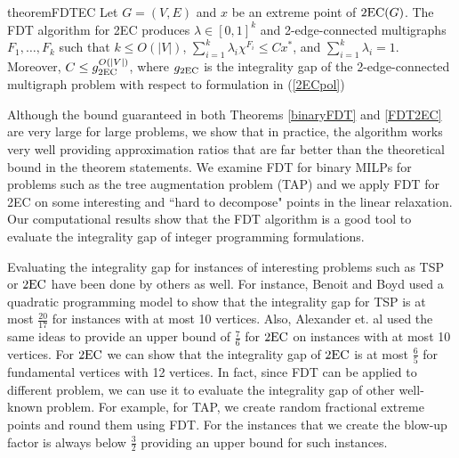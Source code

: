 \begin{restatable}{theorem}{FDTEC}
	\label{FDT2EC}
	Let $G=(V,E)$ and $x$ be an extreme point of  $\operatorname{2EC}(G)$. The FDT algorithm for 2EC produces $\lambda\in [0,1]^k$ and 2-edge-connected multigraphs $F_1,\ldots,F_k$ such that $k\leq O(|V|)$, $\sum_{i=1}^{k}\lambda_i \chi^{F_i}\leq Cx^*$, and $\sum_{i=1}^{k}\lambda_i = 1$. Moreover, $C\leq g_{\operatorname{2EC}}^{O(|V|)}$, where $g_{\operatorname{2EC}}$ is the integrality gap of the 2-edge-connected multigraph problem with respect to formulation in (\ref{2ECpol}) 
\end{restatable}


Although the bound guaranteed in both Theorems \ref{binaryFDT} and \ref{FDT2EC} are very large for large problems, we show that in practice, the algorithm works very well providing approximation ratios that are far better than the theoretical bound in the theorem statements. We examine FDT for binary MILPs for problems such as the tree augmentation problem (TAP) and we apply FDT for 2EC on some interesting and ``hard to decompose" points in the linear relaxation. Our computational results show that the FDT algorithm is a good tool to evaluate the integrality gap of integer programming formulations. 

Evaluating the integrality gap for instances of interesting problems such as TSP or $\operatorname{2EC}$ have been done by others as well. For instance, Benoit and Boyd \cite{TSPcompute} used a quadratic programming model to show that the integrality gap for TSP is at most $\frac{20}{17}$ for instances with at most 10 vertices. Also,  Alexander et. al \cite{abe} used the same ideas to provide an upper bound of $\frac{7}{6}$ for $\operatorname{2EC}$ on instances with at most 10 vertices. For $\operatorname{2EC}$ we can show that the integrality gap of $\operatorname{2EC}$ is at most $\frac{6}{5}$ for fundamental vertices with 12 vertices. In fact, since FDT can be applied to different problem, we can use it to evaluate the integrality gap of other well-known problem. For example, for TAP, we create random fractional extreme points and round them using FDT. For the instances that we create the blow-up factor is always below $\frac{3}{2}$ providing an upper bound for such instances.


